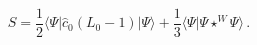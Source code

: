 \begin{equation}
S={\frac{1}{2}}\langle \Psi |\hat{c}_{0}(L_{0}-1)|\Psi \rangle +{\frac{1}{3}}%
\langle \Psi |\Psi \star ^{W}\Psi \rangle \,.  \label{eq:action_bra_ket}
\end{equation}

